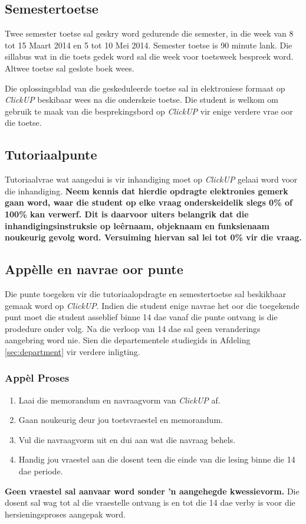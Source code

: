     \subsection{Semestertoetse}
    Twee semester toetse sal geskry word gedurende die semester, in
    die week van 8 tot 15 Maart 2014 en 5 tot 10 Mei 2014. Semester
    toetse is 90 minute lank.  Die sillabus wat in die toets gedek
    word sal die week voor toetsweek bespreek word.  Altwee toetse sal
    geslote boek wees.
        
    Die oplossingsblad van die geskeduleerde toetse sal in
    elektroniese formaat op \textit{ClickUP} beskibaar wees na die onderskeie
    toetse. Die student is welkom om gebruik te maak van die
    besprekingsbord op \textit{ClickUP} vir enige verdere vrae oor die
    toetse.

    \subsection{Tutoriaalpunte}
    \label{sec:tutoriaal}

    Tutoriaalvrae wat aangedui is vir inhandiging moet op
    \textit{ClickUP} gelaai word voor die inhandiging. \textbf{Neem
      kennis dat hierdie opdragte elektronies gemerk gaan word, waar
      die student op elke vraag onderskeidelik slegs 0\% of 100\% kan
      verwerf. Dit is daarvoor uiters belangrik dat die
      inhandigingsinstruksie op le\^ernaam, objeknaam en funksienaam
      noukeurig gevolg word.  Versuiming hiervan sal lei tot 0\% vir
      die vraag.}


    \subsection{App\`{e}lle en navrae oor punte}
    Die punte toegeken vir die tutoriaalopdragte en semestertoetse sal
    beskikbaar gemaak word op \textit{ClickUP}. Indien die student
    enige navrae het oor die toegekende punt moet die student
    asseblief binne 14 dae vanaf die punte ontvang is die prodedure
    onder volg.  Na die verloop van 14 dae sal geen veranderings
    aangebring word nie. Sien die departementele studiegids in
    Afdeling \ref{sec:department} vir verdere inligting.

    \subsubsection{App\`{e}l Proses}
    \begin{enumerate}
                \item Laai die memorandum en navraagvorm van \textit{ClickUP} af.
                \item Gaan noukeurig deur jou toetsvraestel en memorandum.
                \item Vul die navraagvorm uit en dui aan wat die
                  navraag behels.
                \item Handig jou vraestel aan die dosent teen die
                  einde van die lesing binne die 14 dae periode.
            \end{enumerate}

            \textbf{Geen vraestel sal aanvaar word sonder 'n
              aangehegde kwessievorm.}  Die dosent sal wag tot al die
            vraestelle ontvang is en tot die 14 dae verby is voor die
            hersieningsproses aangepak word.

        


